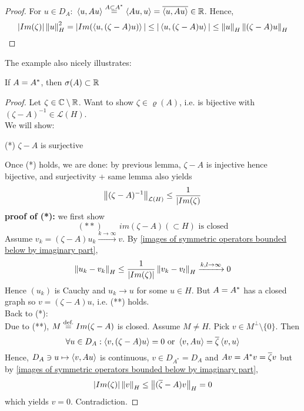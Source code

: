 \documentclass{article}
\begin{document}
\begin{proof}
		For $u\in D_A:$ $\left<{u},{Au}\right>\stackrel{A\subset{A}^*}{=}\left<{Au},{u}\right>=\overline{\left<{u},{Au}\right>}\in\mathbb{R}$. Hence,
		$$
			|Im(\zeta)|\left\|{u}\right\|^2_H=|Im(\left<{u},{(\zeta-A)u)}\right>|\leq|\left<{u},{(\zeta-A)u}\right>|\leq\left\|{u}\right\|_H\left\|{(\zeta-A)u}\right\|_H
		$$
\end{proof}
The example also nicely illustrates:
\begin{proposition}
	If $A={A}^*$, then $\sigma(A)\subset \mathbb{R}$
\end{proposition}
\begin{proof}
		Let $\zeta\in\mathbb{C}\setminus\mathbb{R}$. Want to show $\zeta\in\varrho(A)$, i.e.  is bijective with $(\zeta-A)^{-1}\in\mathcal{L}(H)$.\\
		We will show:\\
  \begin{center}
     		(*) $\zeta-A$ is surjective 
  \end{center}
		Once  (*) holds, we are done: by previous lemma, $\zeta-A$ is injective hence bijective, and surjectivity + same lemma also yields
		$$
			\left\|{(\zeta-A)^{-1}}\right\|_{\mathcal{L}(H)}\leq\frac{1}{|Im(\zeta)}
		$$
		\textbf{proof of (*):} we first show
		$$
			(**)\qquad im(\zeta-A)(\subset H) \text{  is closed}
		$$
		Assume $v_k=(\zeta-A)u_k\xrightarrow{k\to\infty}v$. By \cref{images of symmetric operators bounded below by imaginary part},
		$$
			\left\|{u_k-v_k}\right\|_H\leq\frac{1}{|Im(\zeta)|}\left\|{v_k-v_l}\right\|_H\xrightarrow{k,l\to\infty}0$$
   Hence $(u_k)$ is Cauchy and $u_k\to u$ for some $u\in H$. But $A={A}^*$ has a closed graph so $v=(\zeta-A)u$, i.e. (**) holds.\\ 
		Back to (*):\\
		Due to (**), $M\stackrel{\text{def.}}{=} Im(\zeta-A)$ is closed. Assume $M\neq H$. Pick $v\in M^\perp\setminus\{0\}$. Then
		$$
			\forall u\in D_A:\left<{v},{(\zeta-A)u}\right>=0\text{  or  }\left<{v},{Au}\right>=\overline{\zeta}\left<{v},{u}\right>$$
		Hence,
		$
			D_A\ni u\mapsto \left<{v},{Au}\right>
		$
		is continuous, $v\in D_{A^*}=D_A$ and $Av={A}^*v=\overline{\zeta}v$
		but by \cref{images of symmetric operators bounded below by imaginary part},
		$$|Im(\zeta)|\left\|{v}\right\|_H\leq\left\|{(\overline{\zeta}-A)v}\right\|_H=0$$
		which yields $v=0$. Contradiction.
  \end{proof}
 
\end{document}
